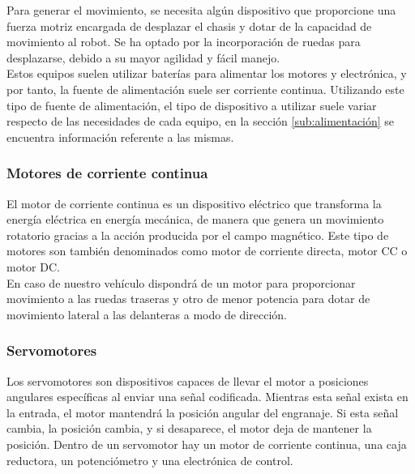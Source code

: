 Para generar el movimiento, se necesita algún dispositivo que proporcione una fuerza motriz encargada de desplazar el chasis y dotar de la capacidad de movimiento al robot.
Se ha optado por la incorporación de ruedas para desplazarse, debido a su mayor agilidad y fácil manejo.\\

Estos equipos suelen utilizar baterías para alimentar los motores y electrónica, y por tanto, la fuente de alimentación suele ser corriente continua. Utilizando este tipo de fuente de alimentación, 
el tipo de dispositivo a utilizar suele variar respecto de las necesidades de cada equipo, en la sección \ref{sub:alimentación} se encuentra información referente a las mismas.

\subsubsection{Motores de corriente continua}

El motor de corriente continua es un dispositivo eléctrico que transforma la energía eléctrica en energía mecánica, de manera que genera un movimiento rotatorio gracias a la  
acción producida por el campo magnético. Este tipo de motores son también denominados como motor de corriente directa, motor CC o motor DC.\\

En caso de nuestro vehículo dispondrá de un motor para proporcionar movimiento a las ruedas traseras y otro de menor potencia para dotar de movimiento lateral a las delanteras 
a modo de dirección.

\subsubsection{Servomotores}

Los servomotores son dispositivos capaces de llevar el motor a posiciones angulares específicas al enviar una señal codificada. Mientras esta señal exista en la entrada, 
el  motor  mantendrá  la  posición  angular  del  engranaje. Si esta señal cambia, la posición cambia, y si desaparece, el motor deja de mantener la posición. Dentro de un servomotor hay un motor de corriente
continua, una caja reductora, un potenciómetro y una electrónica de control.\\

